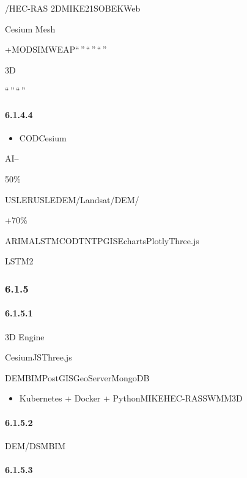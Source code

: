 /HEC-RAS 2DMIKE21SOBEKWeb

Cesium Mesh

+MODSIMWEAP``\,''\,``\,''\,``\,''

3D

``\,''\,``\,''

\hypertarget{section-35}{%
\paragraph{6.1.4.4}\label{section-35}}

\begin{itemize}
\tightlist
\item
  CODCesium
\end{itemize}

AI--

50\%

USLERUSLEDEM/Landsat/DEM/

+70\%

ARIMALSTMCODTNTPGISEchartsPlotlyThree.js

LSTM2

\hypertarget{section-36}{%
\subsubsection{6.1.5}\label{section-36}}

\hypertarget{section-37}{%
\paragraph{6.1.5.1}\label{section-37}}

3D Engine

CesiumJSThree.js

DEMBIMPostGISGeoServerMongoDB

\begin{itemize}
\tightlist
\item
  Kubernetes + Docker + PythonMIKEHEC-RASSWMM3D
\end{itemize}

\hypertarget{section-38}{%
\paragraph{6.1.5.2}\label{section-38}}

DEM/DSMBIM

\hypertarget{section-39}{%
\paragraph{6.1.5.3}\label{section-39}}

